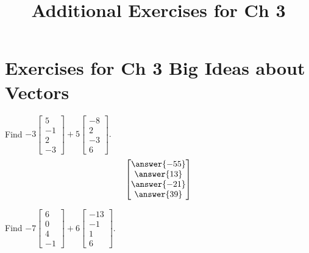 \documentclass{ximera}
\title{Additional Exercises for Ch 3} \license{CC BY-NC-SA 4.0}
\begin{document}
\begin{abstract}
\end{abstract}
\maketitle

\section*{Exercises for Ch 3 Big Ideas about Vectors}

\begin{problem}\label{prb:3.1} Find $-3
\begin{bmatrix}
5 \\
-1 \\
2 \\
-3
\end{bmatrix}
 +5
\begin{bmatrix}
-8 \\
2 \\
-3 \\
6
\end{bmatrix}.$
$$\begin{bmatrix}
\answer{-55} \\
\answer{13} \\
\answer{-21} \\
\answer{39}
\end{bmatrix}$$
\end{problem}

\begin{problem}\label{prb:3.2} Find $-7
\begin{bmatrix}
6 \\
0 \\
4 \\
-1
\end{bmatrix} +6
\begin{bmatrix}
-13 \\
-1 \\
1 \\
6
\end{bmatrix}.$
\end{problem}
\end{document}
